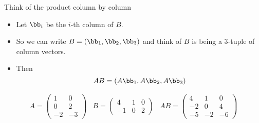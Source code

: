 \documentclass{beamer}
\begin{document}
\begin{frame}{Think of the product column by column}

\begin{itemize}
\item Let $\bb_i$ be the $i$-th column of $B$.
\item So we can write $B = (\bb_1, \bb_2, \bb_3)$ and think of $B$ is
being a 3-tuple of column vectors.
\item Then
$$A B = (A\bb_1, A\bb_2, A\bb_3)$$
\end{itemize}

$$
\begin{matrix}
A =

\begin{pmatrix}
1 & 0 \\
0 & 2 \\
-2 & -3
\end{pmatrix}

&

B =

\begin{pmatrix}
4  & 1 & 0 \\
-1 & 0 & 2
\end{pmatrix}

&

A B =

\begin{pmatrix}
4 & 1 & 0 \\
-2 & 0 & 4 \\
-5 & -2 & -6
\end{pmatrix}

\end{matrix}
$$

\end{frame}

\end{document}
